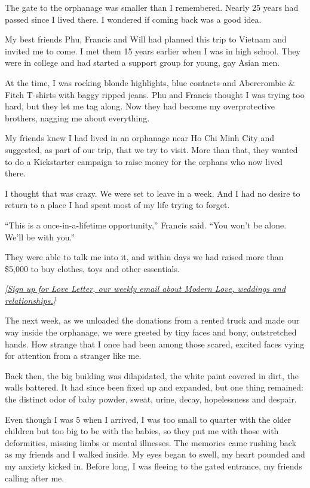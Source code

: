 The gate to the orphanage was smaller than I remembered. Nearly 25 years
had passed since I lived there. I wondered if coming back was a good
idea.

My best friends Phu, Francis and Will had planned this trip to Vietnam
and invited me to come. I met them 15 years earlier when I was in high
school. They were in college and had started a support group for young,
gay Asian men.

At the time, I was rocking blonde highlights, blue contacts and
Abercrombie \& Fitch T-shirts with baggy ripped jeans. Phu and Francis
thought I was trying too hard, but they let me tag along. Now they had
become my overprotective brothers, nagging me about everything.

My friends knew I had lived in an orphanage near Ho Chi Minh City and
suggested, as part of our trip, that we try to visit. More than that,
they wanted to do a Kickstarter campaign to raise money for the orphans
who now lived there.

I thought that was crazy. We were set to leave in a week. And I had no
desire to return to a place I had spent most of my life trying to
forget.

``This is a once-in-a-lifetime opportunity,'' Francis said. ``You won't
be alone. We'll be with you.''

They were able to talk me into it, and within days we had raised more
than \$5,000 to buy clothes, toys and other essentials.

\emph{{[}}\href{https://www.nytimes3xbfgragh.onion/newsletters/love-letter}{\emph{Sign
up for Love Letter, our weekly email about Modern Love, weddings and
relationships.}}\emph{{]}}

The next week, as we unloaded the donations from a rented truck and made
our way inside the orphanage, we were greeted by tiny faces and bony,
outstretched hands. How strange that I once had been among those scared,
excited faces vying for attention from a stranger like me.

Back then, the big building was dilapidated, the white paint covered in
dirt, the walls battered. It had since been fixed up and expanded, but
one thing remained: the distinct odor of baby powder, sweat, urine,
decay, hopelessness and despair.

Even though I was 5 when I arrived, I was too small to quarter with the
older children but too big to be with the babies, so they put me with
those with deformities, missing limbs or mental illnesses. The memories
came rushing back as my friends and I walked inside. My eyes began to
swell, my heart pounded and my anxiety kicked in. Before long, I was
fleeing to the gated entrance, my friends calling after me.

